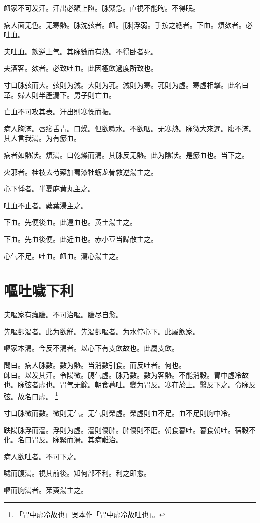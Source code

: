 \documentclass[12pt,oneside,UTF8,b5paper]{ctexbook}她她她她她她她
\begin{document}
衄家不可发汗。汗出必額上陷。脉緊急。直視不能眴。不得眠。

病人面无色。无寒熱。脉沈弦者。衄。[脉]浮弱。手按之絶者。下血。煩欬者。必吐血。

夫吐血。欬逆上气。其脉數而有熱。不得卧者死。

夫酒客。欬者。必致吐血。此因極飲過度所致也。

寸口脉弦而大。弦則为減。大則为芤。減則为寒。芤則为虚。寒虚相擊。此名曰革。婦人則半產漏下。男子則亡血。

亡血不可攻其表。汗出則寒慄而振。

病人胸滿。唇痿舌青。口燥。但欲嗽水。不欲咽。无寒熱。脉微大來遲。腹不滿。其人言我滿。为有瘀血。

病者如熱狀。煩滿。口乾燥而渴。其脉反无熱。此为陰狀。是瘀血也。当下之。

火邪者。桂枝去芍藥加蜀漆牡蛎龙骨救逆湯主之。

心下悸者。半夏麻黄丸主之。

吐血不止者。蘗葉湯主之。

下血。先便後血。此遠血也。黄土湯主之。

下血。先血後便。此近血也。赤小豆当歸散主之。

心气不足。吐血。衄血。瀉心湯主之。

\chapter{嘔吐噦下利}

夫嘔家有癰膿。不可治嘔。膿尽自愈。

先嘔卻渴者。此为欲觧。先渴卻嘔者。为水停心下。此屬飲家。

嘔家本渴。今反不渴者。以心下有支飲故也。此屬支飲。

問曰。病人脉數。數为熱。当消數引食。而反吐者。何也。\\
師曰。以发其汗。令陽微。膈气虚。脉乃數。數为客熱。不能消穀。胃中虚冷故也。脉弦者虚也。胃气无餘。朝食暮吐。變为胃反。寒在於上。醫反下之。令脉反弦。故名曰虚。
	\footnote{「胃中虚冷故也」吳本作「胃中虚冷故吐也」。}

寸口脉微而數。微則无气。无气則榮虚。榮虚則血不足。血不足則胸中冷。

趺陽脉浮而濇。浮則为虚。濇則傷脾。脾傷則不磨。朝食暮吐。暮食朝吐。宿穀不化。名曰胃反。脉緊而濇。其病難治。

病人欲吐者。不可下之。

噦而腹滿。視其前後。知何部不利。利之即愈。

嘔而胸滿者。茱萸湯主之。
\end{document}
